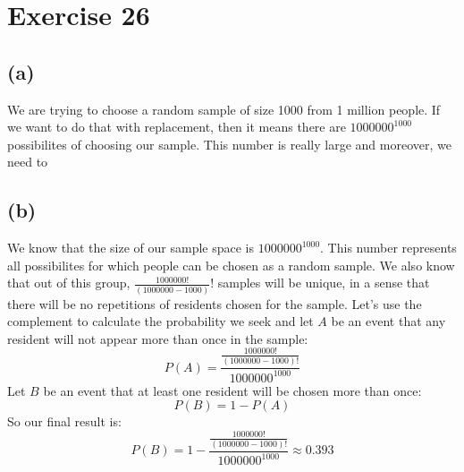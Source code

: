 \documentclass{article}
\begin{document}
\section*{Exercise 26}
\subsection*{(a)}

We are trying to choose a random sample of size 1000 from 1 million people. If we want to do that with replacement, then it means
there are \(1 000 000^{1000}\) possibilites of choosing our sample. This number is really large and moreover, we need to 

\subsection*{(b)}

We know that the size of our sample space is \(1 000 000^{1000}\). This number represents all possibilites for which people
can be chosen as a random sample. We also know that out of this group, \(\frac{1 000 000!}{(1 000 000 - 1000)}!\) samples will
be unique, in a sense that there will be no repetitions of residents chosen for the sample. Let's use the complement to 
calculate the probability we seek and let \(A\) be an event that any resident will not appear more than once in the sample:
\begin{equation*}
    P(A) = \frac{\frac{1000000!}{(1000000 - 1000)!}}{1000000^{1000}}
\end{equation*}
Let \(B\) be an event that at least one resident will be chosen more than once:
\begin{equation*}
    P(B) = 1 - P(A)
\end{equation*}
So our final result is:
\begin{equation*}
    P(B) = 1 - \frac{\frac{1000000!}{(1000000 - 1000)!}}{1000000^{1000}} \approx 0.393
\end{equation*}
\end{document}
